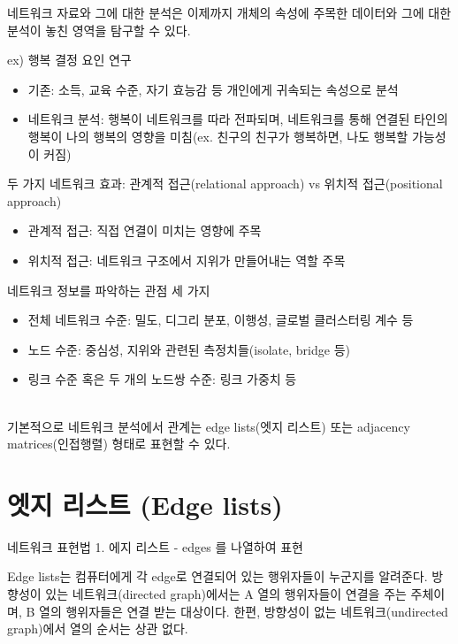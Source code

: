 \documentclass[
]{book}
\providecommand{\tightlist}{%
  \setlength{\itemsep}{0pt}\setlength{\parskip}{0pt}}
\begin{document}
네트워크 자료와 그에 대한 분석은 이제까지 개체의 속성에 주목한 데이터와 그에 대한 분석이 놓친 영역을 탐구할 수 있다.

ex) 행복 결정 요인 연구

\begin{itemize}
\tightlist
\item
  기존: 소득, 교육 수준, 자기 효능감 등 개인에게 귀속되는 속성으로 분석\\
\item
  네트워크 분석: 행복이 네트워크를 따라 전파되며, 네트워크를 통해 연결된 타인의 행복이 나의 행복의 영향을 미침(ex. 친구의 친구가 행복하면, 나도 행복할 가능성이 커짐)
\end{itemize}

두 가지 네트워크 효과: 관계적 접근(relational approach) vs 위치적 접근(positional approach)

\begin{itemize}
\tightlist
\item
  관계적 접근: 직접 연결이 미치는 영향에 주목
\item
  위치적 접근: 네트워크 구조에서 지위가 만들어내는 역할 주목
\end{itemize}

네트워크 정보를 파악하는 관점 세 가지

\begin{itemize}
\tightlist
\item
  전체 네트워크 수준: 밀도, 디그리 분포, 이행성, 글로벌 클러스터링 계수 등
\item
  노드 수준: 중심성, 지위와 관련된 측정치들(isolate, bridge 등)
\item
  링크 수준 혹은 두 개의 노드쌍 수준: 링크 가중치 등
\end{itemize}

\strut \\
기본적으로 네트워크 분석에서 관계는 edge lists(엣지 리스트) 또는 adjacency matrices(인접행렬) 형태로 표현할 수 있다.

\hypertarget{uxc5e3uxc9c0-uxb9acuxc2a4uxd2b8-edge-lists}{%
\section{엣지 리스트 (Edge lists)}\label{uxc5e3uxc9c0-uxb9acuxc2a4uxd2b8-edge-lists}}

네트워크 표현법 1. 에지 리스트 - edges 를 나열하여 표현

Edge lists는 컴퓨터에게 각 edge로 연결되어 있는 행위자들이 누군지를 알려준다.
방향성이 있는 네트워크(directed graph)에서는 A 열의 행위자들이 연결을 주는 주체이며, B 열의 행위자들은 연결 받는 대상이다. 한편, 방향성이 없는 네트워크(undirected graph)에서 열의 순서는 상관 없다.
\end{document}
